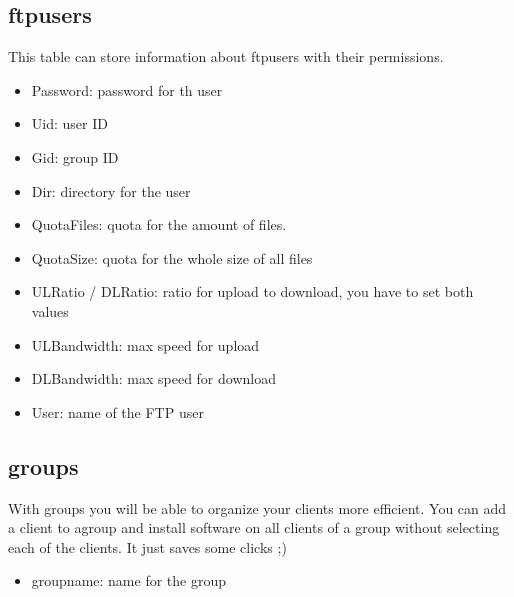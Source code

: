 \subsection{ftpusers}
This table can store information about ftpusers with their permissions.
\begin{itemize}
\item Password: password for th user
\item Uid: user ID
\item Gid: group ID
\item Dir: directory for the user
\item QuotaFiles: quota for the amount of files.
\item QuotaSize: quota for the whole size of all files
\item ULRatio / DLRatio: ratio for upload to download, you have to set both values
\item ULBandwidth: max speed for upload
\item DLBandwidth: max speed for download
\item User: name of the FTP user
\end{itemize}

\subsection{groups}
With groups you will be able to organize your clients more efficient. You can add a client to agroup and install software on all clients of a group without selecting each of the clients. It just saves some clicks ;)
\begin{itemize}
\item groupname: name for the group
\end{itemize}

